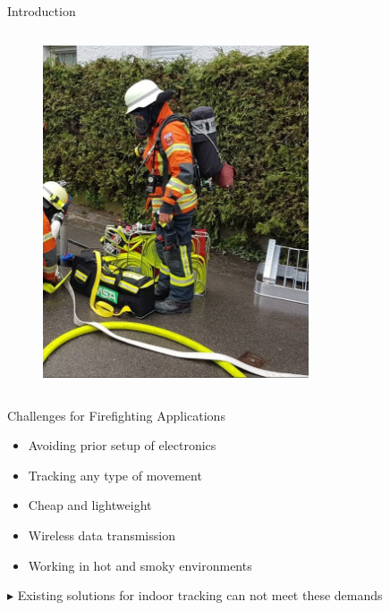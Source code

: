 \documentclass[aspectratio=169,handout]{beamer}
\begin{document}
{\begin{frame}{Introduction}
\begin{columns}
				\begin{figure}
					\centering
					\includegraphics[width=0.7\textwidth]{firefighter.png}
				\end{figure}
	
		\end{columns}
		
		
	\end{frame}
	
	\begin{frame}{Challenges for Firefighting Applications}
		\begin{itemize}
			\item<2-> Avoiding prior setup of electronics
			\item<3-> Tracking any type of movement
			\item<4-> Cheap and lightweight %
			\item<5-> Wireless data transmission %
			\item<6-> Working in hot and smoky environments %
		\end{itemize}
		\pause
		\pause
		\pause
		\pause
		\pause
		\pause
		\begin{block}{$\blacktriangleright$ Existing solutions for indoor tracking can not meet these demands}
			
		\end{block}
		
	\end{frame}
	
}
\end{document}
